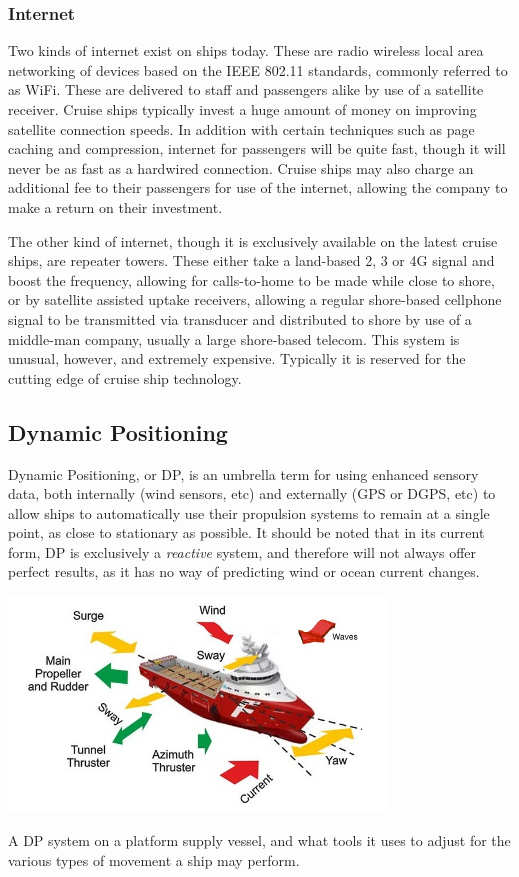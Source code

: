 \documentclass[11pt,a4paper]{article}
\begin{document}
\subsubsection{Internet}
Two kinds of internet exist on ships today. These are radio wireless local area networking of devices based on the IEEE 802.11 standards, commonly referred to as WiFi. These are delivered to staff and passengers alike by use of a satellite receiver. Cruise ships typically invest a huge amount of money on improving satellite connection speeds. In addition with certain techniques such as page caching and compression, internet for passengers will be quite fast, though it will never be as fast as a hardwired connection. Cruise ships may also charge an additional fee to their passengers for use of the internet, allowing the company to make a return on their investment.

The other kind of internet, though it is exclusively available on the latest cruise ships, are repeater towers. These either take a land-based 2, 3 or 4G signal and boost the frequency, allowing for calls-to-home to be made while close to shore, or by satellite assisted uptake receivers, allowing a regular shore-based cellphone signal to be transmitted via transducer and distributed to shore by use of a middle-man company, usually a large shore-based telecom. This system is unusual, however, and extremely expensive. Typically it is reserved for the cutting edge of cruise ship technology.
\subsection{Dynamic Positioning}
Dynamic Positioning, or DP, is an umbrella term for using enhanced sensory data, both internally (wind sensors, etc) and externally (GPS or DGPS, etc) to allow ships to automatically use their propulsion systems to remain at a single point, as close to stationary as possible. It should be noted that in its current form, DP is exclusively a \textit{reactive} system, and therefore will not always offer perfect results, as it has no way of predicting wind or ocean current changes.
\begin{center}
\includegraphics[width=10cm]{dp.jpg}\par
A DP system on a platform supply vessel, and what tools it uses to adjust for the various types of movement a ship may perform.
\end{center}
\end{document}
